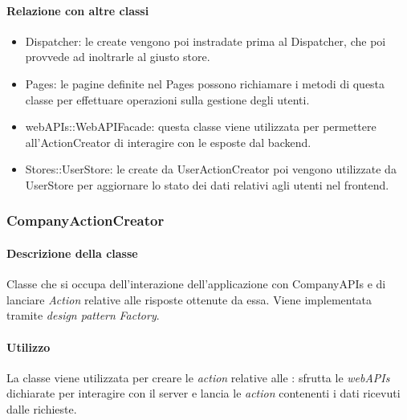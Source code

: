 \paragraph*{Relazione con altre classi}
\begin{itemize}
\item Dispatcher: le  create vengono poi instradate prima al Dispatcher, che poi provvede ad inoltrarle al giusto store.
\item Pages: le pagine definite nel  Pages possono richiamare i metodi di questa classe per effettuare operazioni sulla gestione degli utenti.
\item webAPIs::WebAPIFacade: questa classe viene utilizzata per permettere all'ActionCreator di interagire con le  esposte dal backend.
\item Stores::UserStore: le  create da UserActionCreator poi vengono utilizzate da UserStore per aggiornare lo stato dei dati relativi agli utenti nel frontend.
\end{itemize}

\subsubsection{CompanyActionCreator}
\paragraph*{Descrizione della classe}
Classe che si occupa dell'interazione dell'applicazione con CompanyAPIs e di lanciare \textit{Action} relative alle risposte ottenute da essa. Viene implementata tramite \textit{design pattern} \textit{Factory}.
\paragraph*{Utilizzo}
La classe viene utilizzata per creare le \textit{action} relative alle : sfrutta le \textit{webAPIs} dichiarate per interagire con il server e lancia le \textit{action} contenenti i dati ricevuti dalle  richieste.

